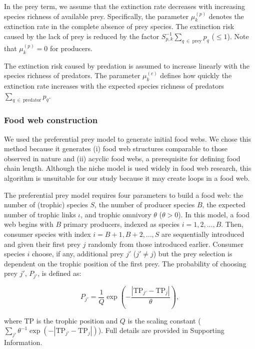 \documentclass[11pt, class=article, crop=false]{standalone}
\begin{document}
In the prey term, we assume that the extinction rate decreases with increasing species richness of available prey.
Specifically, the parameter $\mu_{k}^{(p)}$ denotes the extinction rate in the complete absence of prey species.
The extinction risk caused by the lack of prey is reduced by the factor $S_{p, k}^{-1} \sum_{q~\in~\text{prey}} p_{q}$ ($\le 1$).
Note that $\mu_{k}^{(p)} = 0$ for producers.

The extinction risk caused by predation is assumed to increase linearly with the species richness of predators.
The parameter $\mu_{k}^{(c)}$ defines how quickly the extinction rate increases with the expected species richness of predators $\sum_{q~\in~\text{predator}} p_{q}$.

\subsubsection{Food web construction}

We used the preferential prey model to generate initial food webs.
We chose this method because it generates (i) food web structures comparable to those observed in nature and (ii) acyclic food webs, a prerequisite for defining food chain length.
Although the niche model is used widely in food web research, this algorithm is unsuitable for our study because it may create loops in a food web.

The preferential prey model requires four parameters to build a food web: the number of (trophic) species $S$, the number of producer species $B$, the expected number of trophic links $\iota$, and trophic omnivory $\theta$ ($\theta > 0$).
In this model, a food web begins with $B$ primary producers, indexed as species $i = 1, 2, ..., B$.
Then, consumer species with index $i = B + 1, B + 2, ..., S$ are sequentially introduced and given their first prey $j$ randomly from those introduced earlier.
Consumer species $i$ choose, if any, additional prey $j'$ ($j' \ne j$) but the prey selection is dependent on the trophic position of the first prey.
The probability of choosing prey $j'$, $P_{j'}$, is defined as:

\begin{equation}
    P_{j'} = \frac{1}{Q} \exp(-\frac{|\mbox{TP}_{j'} - \mbox{TP}_j|}{\theta}),
\end{equation}

where $\mbox{TP}$ is the trophic position and $Q$ is the scaling constant ($\sum_{j'} \theta^{-1} \exp(-|\mbox{TP}_{j'} - \mbox{TP}_j|)$).
Full details are provided in Supporting Information.
\end{document}
